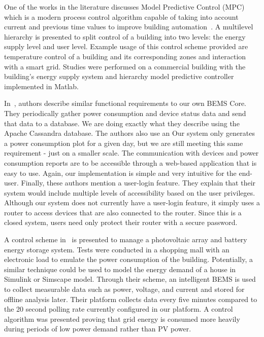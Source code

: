 One of the works in the literature discusses Model Predictive Control (MPC)
which is a modern process control algorithm capable of taking into account
current and previous time values to improve building
automation~\cite{Mayer2017}. A multilevel hierarchy is presented to split
control of a building into two levels: the energy supply level and user level.
Example usage of this control scheme provided are temperature control of a
building and its corresponding zones and interaction with a smart grid. Studies
were performed on a commercial building with the building's energy supply system
and hierarchy model predictive controller implemented in Matlab.

In~\cite{8246800}, authors describe similar functional requirements to our
own BEMS Core. They periodically gather power consumption and device status data
and send that data to a database. We are doing exactly what they describe using
the Apache Cassandra database. The authors also use an  Our system only
generates a power consumption plot for a given day, but we are still meeting
this same requirement - just on a smaller scale. The communication with devices
and power consumption reports are to be accessible through a web-based
application that is easy to use. Again, our implementation is simple and very
intuitive for the end-user. Finally, these authors mention a user-login feature.
They explain that their system would include multiple levels of accessibility
based on the user privileges. Although our system does not currently have a
user-login feature, it simply uses a router to access devices that are also
connected to the router. Since this is a closed system, users need only protect
their router with a secure password.

A control scheme in~\cite{Barchi2018} is presented to manage a photovoltaic
array and battery energy storage system. Tests were conducted in a shopping mall
with an electronic load to emulate the power consumption of the building.
Potentially, a similar technique could be used to model the energy demand of a
house in Simulink or Simscape model. Through their scheme, an intelligent BEMS
is used to collect measurable data such as power, voltage, and current and stored for offline analysis later. Their platform collects data every five minutes compared to the 20 second polling rate currently configured in our platform. A control algorithm was presented proving that grid energy is consumed more heavily during periods of low power demand rather than PV power.

